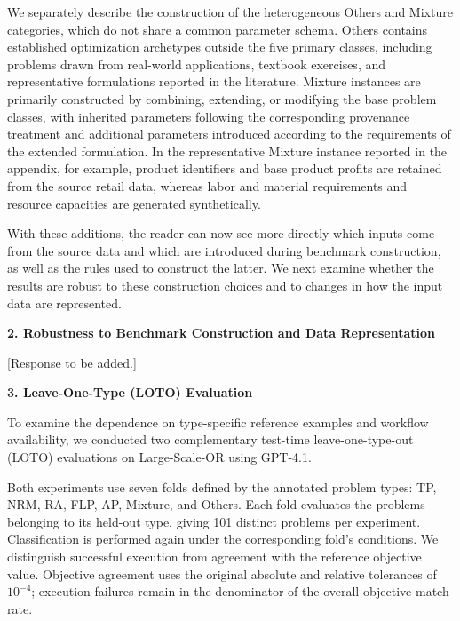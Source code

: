 \documentclass[11pt]{article}
\begin{document}
\begin{enumerate}[label=(R1.Major.\arabic*),leftmargin=*]
We separately describe the construction of the heterogeneous Others and
Mixture categories, which do not share a common parameter schema. Others
contains established optimization archetypes outside the five primary
classes, including problems drawn from real-world applications, textbook
exercises, and representative formulations reported in the literature.
Mixture instances are primarily constructed by combining, extending, or
modifying the base problem classes, with inherited parameters following the
corresponding provenance treatment and additional parameters introduced
according to the requirements of the extended formulation. In the
representative Mixture instance reported in the appendix, for example,
product identifiers and base product profits are retained from the source
retail data, whereas labor and material requirements and resource capacities
are generated synthetically.

With these additions, the reader can now see more directly which inputs come
from the source data and which are introduced during benchmark construction,
as well as the rules used to construct the latter. We next examine whether
the results are robust to these construction choices and to changes in how
the input data are represented.

\vspace{2mm}
\noindent\textbf{2. Robustness to Benchmark Construction and Data Representation}


[Response to be added.]

\vspace{2mm}
\noindent\textbf{3. Leave-One-Type (LOTO) Evaluation}

To examine the dependence on type-specific reference examples and workflow availability, we conducted two complementary test-time leave-one-type-out (LOTO) evaluations on Large-Scale-OR using GPT-4.1.

Both experiments use seven folds defined by the annotated problem types: TP, NRM, RA, FLP, AP, Mixture, and Others. Each fold evaluates the problems belonging to its held-out type, giving 101 distinct problems per experiment. Classification is performed again under the corresponding fold's conditions. We distinguish successful execution from agreement with the reference objective value. Objective agreement uses the original absolute and relative tolerances of \(10^{-4}\); execution failures remain in the denominator of the overall objective-match rate.


\end{enumerate}
\end{document}
